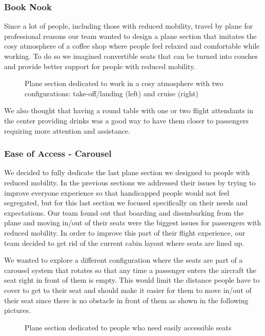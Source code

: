 \subsubsection{Book Nook}
Since a lot of people, including those with reduced mobility, travel by plane for professional reasons our team wanted to design a plane section that imitates the cosy atmosphere of a coffee shop where people feel relaxed and comfortable while working.
To do so we imagined convertible seats that can be turned into couches and provide better support for people with reduced mobility. 

\begin{figure}[h]
  \centering
   \caption{Plane section dedicated to work in a cosy atmosphere with two configurations: take-off/landing (left) and cruise (right)}
  \label{fig:PHOTO ROBBIE}
\end{figure}

We also thought that having a round table with one or two flight attendants in the center providing drinks was a good way to have them closer to passengers requiring more attention and assistance.

\subsubsection{Ease of Access - Carousel}
We decided to fully dedicate the last plane section we designed to people with reduced mobility. In the previous sections we addressed their issues by trying to improve everyone experience so that handicapped people would not feel segregated, but for this last section we focused specifically on their needs and expectations. 
Our team found out that boarding and disembarking from the plane and moving in/out of their seats were the biggest issues for passengers with reduced mobility. In order to improve this part of their flight experience, our team decided to get rid of the current cabin layout where seats are lined up. 

We wanted to explore a different configuration where the seats are part of a carousel system that rotates so that any time a passenger enters the aircraft the seat right in front of them is empty. This would limit the distance people have to cover to get to their seat and should make it easier for them to move in/out of their seat since there is no obstacle in front of them as shown in the following pictures.

\begin{figure}[h]
  \centering
   \caption{Plane section dedicated to people who need easily accessible seats}
  \label{fig:PHOTO ROBBIE}
\end{figure}

